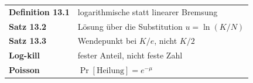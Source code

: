 \begin{merksatz}
\begin{center}
\renewcommand{\arraystretch}{1.5}
\begin{tabular}{@{}P{3.0cm}P{5.6cm}@{}}
\toprule
\textbf{Definition 13.1} & logarithmische statt linearer Bremsung\\
\textbf{Satz 13.2} & Lösung über die Substitution $u = \ln(K/N)$\\
\textbf{Satz 13.3} & Wendepunkt bei $K/e$, nicht $K/2$\\
\textbf{Log-kill} & fester Anteil, nicht feste Zahl\\
\textbf{Poisson} & $\Pr[\text{Heilung}] = e^{-\mu}$\\
\bottomrule
\end{tabular}
\end{center}

\begin{center}
\begin{minipage}{0.88\textwidth}
\end{minipage}
\end{center}
\end{merksatz}
